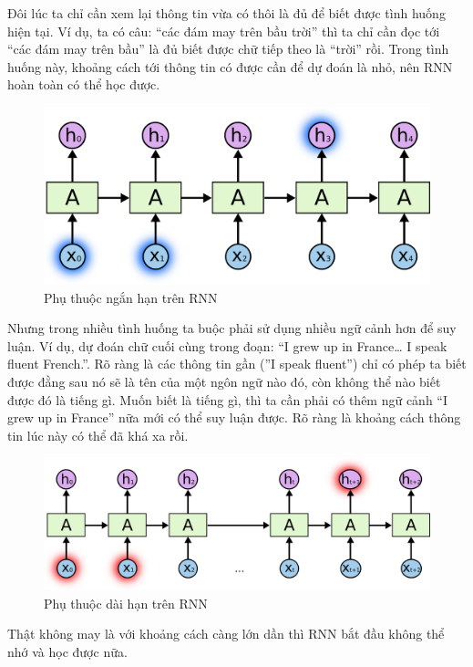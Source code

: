 \indent Đôi lúc ta chỉ cần xem lại thông tin vừa có thôi là đủ để biết được tình huống hiện tại. Ví dụ, ta có câu: “các đám may trên bầu trời” thì ta chỉ cần đọc tới “các đám may trên bầu” là đủ biết được chữ tiếp theo là “trời” rồi. Trong tình huống này, khoảng cách tới thông tin có được cần để dự đoán là nhỏ, nên RNN hoàn toàn có thể học được.
\begin{figure}[H]
    \centering
    \includegraphics[width=\textwidth,height=\textheight,keepaspectratio]{Images/Theoretical basis/RNN-shorttermdepdencies.png}
    \caption{Phụ thuộc ngắn hạn trên RNN}
    \label{fig:enter-label}
\end{figure}
\indent Nhưng trong nhiều tình huống ta buộc phải sử dụng nhiều ngữ cảnh hơn để suy luận. Ví dụ, dự đoán chữ cuối cùng trong đoạn: “I grew up in France… I speak fluent French.”. Rõ ràng là các thông tin gần (”I speak fluent”) chỉ có phép ta biết được đằng sau nó sẽ là tên của một ngôn ngữ nào đó, còn không thể nào biết được đó là tiếng gì. Muốn biết là tiếng gì, thì ta cần phải có thêm ngữ cảnh “I grew up in France” nữa mới có thể suy luận được. Rõ ràng là khoảng cách thông tin lúc này có thể đã khá xa rồi.
\begin{figure}[H]
    \centering
    \includegraphics[width=\textwidth,height=\textheight,keepaspectratio]{Images/Theoretical basis/RNN-longtermdependencies.png}
    \caption{Phụ thuộc dài hạn trên RNN}
    \label{fig:enter-label}
\end{figure}
\indent Thật không may là với khoảng cách càng lớn dần thì RNN bắt đầu không thể nhớ và học được nữa.

